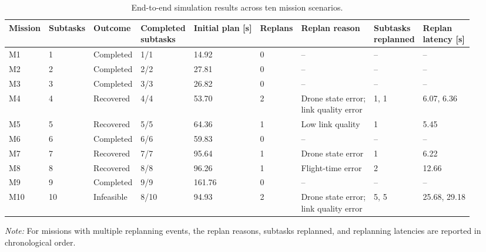 \begin{table}[htbp]
\centering
\caption{End-to-end simulation results across ten mission scenarios.}
\label{tab:simulation_mission_results}
\scriptsize
\setlength{\tabcolsep}{3pt}
\begin{tabularx}{\linewidth}{
l l l l l l l l l
}
\toprule
Mission & Subtasks & Outcome & \makecell[l]{Completed\\subtasks} & Initial plan [s] & Replans & Replan reason & \makecell[l]{Subtasks\\replanned} & \makecell[l]{Replan\\latency [s]} \\
\midrule
M1  & 1  & Completed  & 1/1  & 14.92  & 0 & --                                                   & --   & -- \\
M2  & 2  & Completed  & 2/2  & 27.81  & 0 & --                                                   & --   & -- \\
M3  & 3  & Completed  & 3/3  & 26.82  & 0 & --                                                   & --   & -- \\
M4  & 4  & Recovered  & 4/4  & 53.70  & 2 & \makecell[l]{Drone state error;\\link quality error} & 1, 1 & 6.07, 6.36 \\
M5  & 5  & Recovered  & 5/5  & 64.36  & 1 & Low link quality                                     & 1    & 5.45 \\
M6  & 6  & Completed  & 6/6  & 59.83  & 0 & --                                                   & --   & -- \\
M7  & 7  & Recovered  & 7/7  & 95.64  & 1 & Drone state error                                    & 1    & 6.22 \\
M8  & 8  & Recovered  & 8/8  & 96.26  & 1 & Flight-time error                                    & 2    & 12.66 \\
M9  & 9  & Completed  & 9/9  & 161.76 & 0 & --                                                   & --   & -- \\
M10 & 10 & Infeasible & 8/10 & 94.93  & 2 & \makecell[l]{Drone state error;\\link quality error} & 5, 5 & 25.68, 29.18 \\
\bottomrule
\end{tabularx}

\vspace{0.3em}
\begin{minipage}{\linewidth}
\footnotesize
\textit{Note:} For missions with multiple replanning events, the replan reasons,
subtasks replanned, and replanning latencies are reported in chronological order.
\end{minipage}
\end{table}
